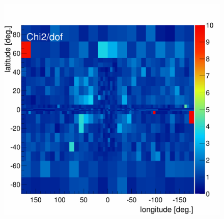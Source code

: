 


\begin{figure}[h]
  \centering
  \begin{minipage}[h]{0.45\textwidth}
  	\centering
	\includegraphics[width=1.\linewidth]{pic/results/MCRonly_chi2Distribution.png}
  	\label{fig:MCRonly_chi2Distribution}
  \end{minipage}
  \hfill
  \begin{minipage}[h]{0.45\textwidth}
  	\centering

\end{minipage}
\end{figure}
